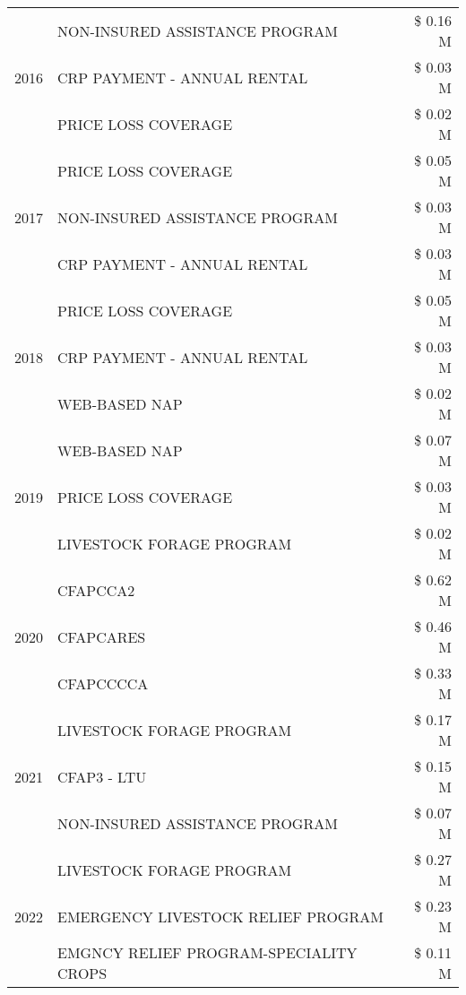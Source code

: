 \begin{tabular}{llr}
\cline{1-3}
\multirow[t]{3}{*}{2016} & NON-INSURED ASSISTANCE PROGRAM & \$ 0.16 M \\
 & CRP PAYMENT - ANNUAL RENTAL & \$ 0.03 M \\
 & PRICE LOSS COVERAGE & \$ 0.02 M \\
\cline{1-3}
\multirow[t]{3}{*}{2017} & PRICE LOSS COVERAGE & \$ 0.05 M \\
 & NON-INSURED ASSISTANCE PROGRAM & \$ 0.03 M \\
 & CRP PAYMENT - ANNUAL RENTAL & \$ 0.03 M \\
\cline{1-3}
\multirow[t]{3}{*}{2018} & PRICE LOSS COVERAGE & \$ 0.05 M \\
 & CRP PAYMENT - ANNUAL RENTAL & \$ 0.03 M \\
 & WEB-BASED NAP & \$ 0.02 M \\
\cline{1-3}
\multirow[t]{3}{*}{2019} & WEB-BASED NAP & \$ 0.07 M \\
 & PRICE LOSS COVERAGE & \$ 0.03 M \\
 & LIVESTOCK FORAGE PROGRAM & \$ 0.02 M \\
\cline{1-3}
\multirow[t]{3}{*}{2020} & CFAPCCA2 & \$ 0.62 M \\
 & CFAPCARES & \$ 0.46 M \\
 & CFAPCCCCA & \$ 0.33 M \\
\cline{1-3}
\multirow[t]{3}{*}{2021} & LIVESTOCK FORAGE PROGRAM & \$ 0.17 M \\
 & CFAP3 - LTU & \$ 0.15 M \\
 & NON-INSURED ASSISTANCE PROGRAM & \$ 0.07 M \\
\cline{1-3}
\multirow[t]{3}{*}{2022} & LIVESTOCK FORAGE PROGRAM & \$ 0.27 M \\
 & EMERGENCY LIVESTOCK RELIEF PROGRAM & \$ 0.23 M \\
 & EMGNCY RELIEF PROGRAM-SPECIALITY CROPS & \$ 0.11 M \\
\cline{1-3}
\bottomrule
\end{tabular}
